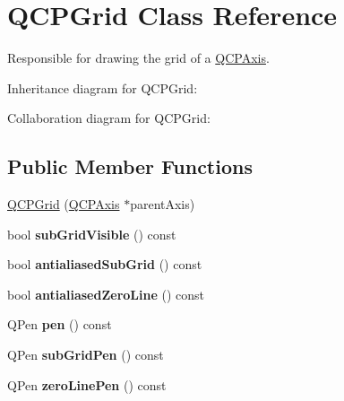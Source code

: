 \hypertarget{class_q_c_p_grid}{}\section{Q\+C\+P\+Grid Class Reference}
\label{class_q_c_p_grid}


Responsible for drawing the grid of a \hyperlink{class_q_c_p_axis}{Q\+C\+P\+Axis}.  




Inheritance diagram for Q\+C\+P\+Grid\+:


Collaboration diagram for Q\+C\+P\+Grid\+:
\subsection*{Public Member Functions}
\begin{DoxyCompactItemize}
\item 
\hyperlink{class_q_c_p_grid_acd1cdd2909625388a13048b698494a17}{Q\+C\+P\+Grid} (\hyperlink{class_q_c_p_axis}{Q\+C\+P\+Axis} $\ast$parent\+Axis)
\item 
bool {\bfseries sub\+Grid\+Visible} () const \hypertarget{class_q_c_p_grid_a0a8963e384d53cd77cbab7df96147458}{}\label{class_q_c_p_grid_a0a8963e384d53cd77cbab7df96147458}

\item 
bool {\bfseries antialiased\+Sub\+Grid} () const \hypertarget{class_q_c_p_grid_abfa6c638a05b45b2ed31b680fc9b31fc}{}\label{class_q_c_p_grid_abfa6c638a05b45b2ed31b680fc9b31fc}

\item 
bool {\bfseries antialiased\+Zero\+Line} () const \hypertarget{class_q_c_p_grid_a4dfbc1cee989d8cae1434b765ab2a13b}{}\label{class_q_c_p_grid_a4dfbc1cee989d8cae1434b765ab2a13b}

\item 
Q\+Pen {\bfseries pen} () const \hypertarget{class_q_c_p_grid_aca20b67548e3ae31fd02e6398ffd6cb9}{}\label{class_q_c_p_grid_aca20b67548e3ae31fd02e6398ffd6cb9}

\item 
Q\+Pen {\bfseries sub\+Grid\+Pen} () const \hypertarget{class_q_c_p_grid_ac698f8c6864b1d8f0e2af97ca4b39cc6}{}\label{class_q_c_p_grid_ac698f8c6864b1d8f0e2af97ca4b39cc6}

\item 
Q\+Pen {\bfseries zero\+Line\+Pen} () const \hypertarget{class_q_c_p_grid_a06ea986b651860446e1224d2097259b9}{}\label{class_q_c_p_grid_a06ea986b651860446e1224d2097259b9}


\end{DoxyCompactItemize}
